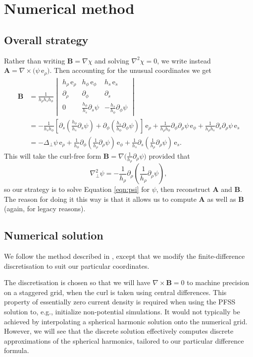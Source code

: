 \documentclass[11pt]{article}
\newcommand{\dy}{\partial}
\newcommand{\Ab}{\boldsymbol{A}}
\newcommand{\Bb}{\boldsymbol{B}}
\newcommand{\evr}{\,\mathrm{e}_\rho}
\newcommand{\evs}{\,\mathrm{e}_s}
\newcommand{\evp}{\,\mathrm{e}_\phi}
\begin{document}
\section{Numerical method}

\subsection{Overall strategy}

Rather than writing $\Bb = \nabla\chi$ and solving $\nabla^2\chi=0$, we write instead $\Ab = \nabla\times\big(\psi \evr\big)$. Then accounting for the unusual coordinates we get
\begin{align}
\Bb &=  \frac{1}{h_\rho h_sh_\phi}
\begin{vmatrix}
h_\rho\evr & h_\phi\evp & h_s\evs\\
\dy_\rho & \dy_\phi & \dy_s\\
0 & \frac{h_\phi}{h_s}\dy_s\psi & -\frac{h_s}{h_\phi}\dy_\phi\psi
\end{vmatrix}\\
&= -\frac{1}{h_sh_\phi}\left[\dy_s\left(\frac{h_\phi}{h_s}\dy_s\psi\right) + \dy_\phi\left(\frac{h_s}{h_\phi}\dy_\phi\psi\right) \right]\evr + \frac{1}{h_\rho h_\phi}\dy_\phi\dy_\rho\psi\evp + \frac{1}{h_\rho h_s}\dy_s\dy_\rho\psi\evs\\
&= -\Delta_\perp\psi\evr + \frac{1}{h_\phi}\dy_\phi\left(\frac{1}{h_\rho}\dy_\rho\psi\right)\evp + \frac{1}{h_s}\dy_s\left(\frac{1}{h_\rho}\dy_\rho\psi\right)\evs.
\end{align}
This will take the curl-free form $\Bb = \nabla\big(\tfrac1{h_\rho}\dy_\rho\psi\big)$ provided that
\begin{equation}
\nabla^2_\perp\psi = -\frac{1}{h_\rho}\dy_\rho\left(\frac{1}{h_\rho}\dy_\rho\psi\right),
\label{eqn:psi}
\end{equation}
so our strategy is to solve Equation \eqref{eqn:psi} for $\psi$, then reconstruct $\Ab$ and $\Bb$. The reason for doing it this way is that it allows us to compute $\Ab$ as well as $\Bb$ (again, for legacy reasons).

\subsection{Numerical solution}

We follow the method described in \cite{vanballe2000}, except that we modify the finite-difference discretisation to suit our particular coordinates.

The discretisation is chosen so that we will have $\nabla\times\Bb=0$ to machine precision on a staggered grid, when the curl is taken using central differences. This property of essentially zero current density is required when using the PFSS solution to, e.g., initialize non-potential simulations. It would not typically be achieved by interpolating a spherical harmonic solution onto the numerical grid. However, we will see that the discrete solution effectively computes discrete approximations of the spherical harmonics, tailored to our particular difference formula.
\end{document}
